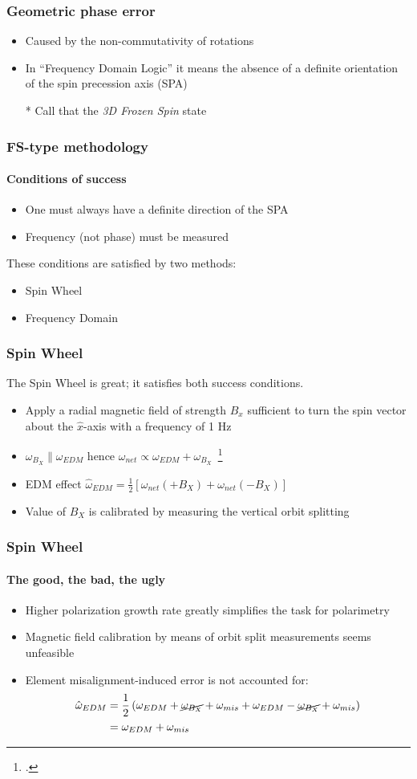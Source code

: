 \documentclass{beamer}
\newcommand{\w}{\omega}
\begin{document}
\begin{frame}\frametitle{Geometric phase error}
  \begin{itemize}
  \item Caused by the non-commutativity of rotations
  \item In ``Frequency Domain Logic'' it means the absence of a definite orientation of
    the spin precession axis (SPA)
  \item[*] Call that the \emph{3D Frozen Spin} state
  \end{itemize}
\end{frame}

\begin{frame}\frametitle{FS-type methodology}\framesubtitle{Conditions of success}
  \begin{itemize}
  \item One must always have a definite direction of the SPA
  \item Frequency (not phase) must be measured
  \end{itemize}
  These conditions are satisfied by two methods:
  \begin{itemize}
  \item Spin Wheel
  \item Frequency Domain
  \end{itemize}
\end{frame}

\begin{frame}\frametitle{Spin Wheel}
  The Spin Wheel is great; it satisfies both success conditions.
  \begin{itemize}
  \item Apply a radial magnetic field of strength $B_x$ sufficient to turn the spin vector about
    the $\hat x$-axis with a frequency of 1 Hz
  \item $\w_{B_X} \parallel \w_{EDM}$ hence $\w_{net} \propto \w_{EDM} + \w_{B_X}$~\footcite[p.~6]{Mane:SpinWheel}
  \item EDM effect $\hat\w_{EDM} = \frac12\left[\w_{net}(+B_X) + \w_{net}(-B_X)\right]$
  \item Value of $B_X$ is calibrated by measuring the vertical orbit splitting
  \end{itemize}
\end{frame}

\begin{frame}\frametitle{Spin Wheel}\framesubtitle{The good, the bad, the ugly}
  \begin{itemize}
  \item Higher polarization growth rate greatly simplifies the task for polarimetry
  \item Magnetic field calibration by means of orbit split measurements seems unfeasible
  \item Element misalignment-induced error is not accounted for:
    \begin{align*}
      \hat\w_{EDM} &= \frac12\left(\w_{EDM} + \cancel{\w_{B_X}} + \w_{mis} + \w_{EDM} - \cancel{\w_{B_X}} + \w_{mis} \right) \\
      &= \w_{EDM} + \w_{mis}
    \end{align*}
  \end{itemize}
\end{frame}
\end{document}
